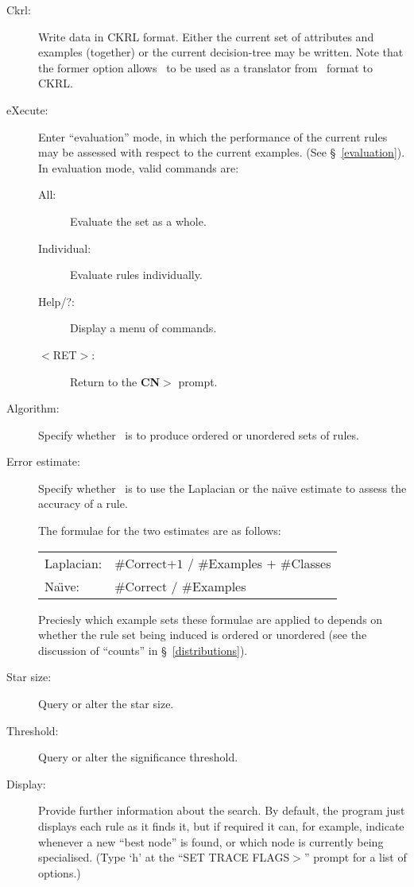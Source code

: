 \begin{description}
\item[Ckrl:] Write data in CKRL format. Either the current set of
    attributes and examples (together) or the current decision-tree
    may be written.  Note that the former option allows \CN\ to be used
    as a translator from \CN\ format to CKRL.

\item[eXecute:] Enter ``evaluation'' mode, in which the performance
                of the current rules may be assessed with respect to
                the current examples.  (See \S~\ref{evaluation}).
                In evaluation mode, valid commands are:

   \begin{description}
    \item[All:] Evaluate the set as a whole.
    \item[Individual:] Evaluate rules individually.
    \item[Help/?:]  Display a menu of commands.
    \item[$<$RET$>$:]  Return to the {\bf CN$>$} prompt.
   \end{description}


\item[Algorithm:] Specify whether \CN\ is to produce 
  ordered or unordered sets of rules.

\item[Error estimate:] Specify whether \CN\ is to use the Laplacian
   or the na\"{\i}ve estimate to assess the accuracy of a rule.

   The formulae for the two estimates are as follows:

\begin{tabular}{ll}
 {\rm Laplacian:}  &  \#{\rm Correct}$ + 1$ / 
                                 \#{\rm Examples} $+$ \#{\rm Classes} \\
 {\rm Na\"{\i}ve:} &  \#{\rm Correct} / \#{\rm Examples}
\end{tabular}


   Preciesly which example sets these formulae are applied to
depends on whether the rule set being induced is ordered 
or unordered (see the discussion of ``counts'' in  \S~\ref{distributions}).

\item[Star size:] Query or alter the star size.

\item[Threshold:] Query or alter the significance threshold.

\item[Display:] Provide further information about the search.  
By default, the program just displays each rule as it finds it, but
if required it can, for example, indicate whenever a new ``best node''
is found, or which node is currently being specialised.  
(Type `h' at the  ``SET TRACE FLAGS$>$'' prompt for a list of options.)


\end{description}
